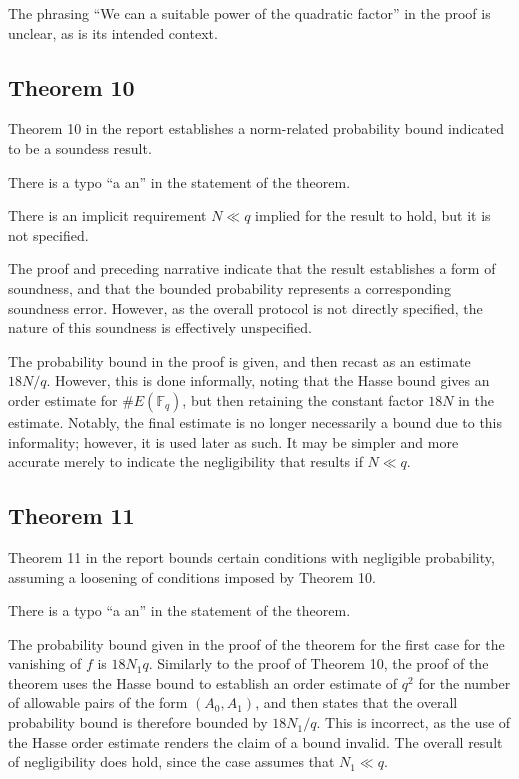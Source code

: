 \documentclass{article}
\begin{document}
The phrasing ``We can a suitable power of the quadratic factor'' in the proof is unclear, as is its intended context.


\subsection{Theorem 10}

Theorem 10 in the report establishes a norm-related probability bound indicated to be a soundess result.

There is a typo ``a an'' in the statement of the theorem.

There is an implicit requirement $N \ll q$ implied for the result to hold, but it is not specified.

The proof and preceding narrative indicate that the result establishes a form of soundness, and that the bounded probability represents a corresponding soundness error.
However, as the overall protocol is not directly specified, the nature of this soundness is effectively unspecified.

The probability bound in the proof is given, and then recast as an estimate $18N/q$.
However, this is done informally, noting that the Hasse bound gives an order estimate for $\# E(\mathbb{F}_q)$, but then retaining the constant factor $18N$ in the estimate.
Notably, the final estimate is no longer necessarily a bound due to this informality; however, it is used later as such.
It may be simpler and more accurate merely to indicate the negligibility that results if $N \ll q$.


\subsection{Theorem 11}

Theorem 11 in the report bounds certain conditions with negligible probability, assuming a loosening of conditions imposed by Theorem 10.

There is a typo ``a an'' in the statement of the theorem.

The probability bound given in the proof of the theorem for the first case for the vanishing of $f$ is $18 N_1 q$.
Similarly to the proof of Theorem 10, the proof of the theorem uses the Hasse bound to establish an order estimate of $q^2$ for the number of allowable pairs of the form $(A_0, A_1)$, and then states that the overall probability bound is therefore bounded by $18 N_1 / q$.
This is incorrect, as the use of the Hasse order estimate renders the claim of a bound invalid.
The overall result of negligibility does hold, since the case assumes that $N_1 \ll q$.
\end{document}
